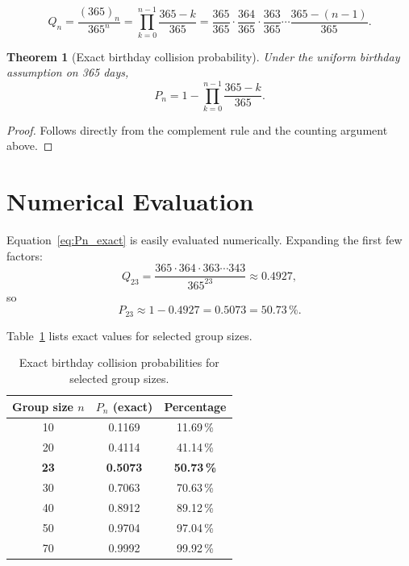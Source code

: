\documentclass[12pt]{report}
\newtheorem{theorem}{Theorem}[chapter]
\theoremstyle{definition}
\begin{document}
\begin{equation}\label{eq:Qn}
  Q_n
  = \frac{(365)_n}{365^n}
  = \prod_{k=0}^{n-1} \frac{365 - k}{365}
  = \frac{365}{365} \cdot \frac{364}{365} \cdot \frac{363}{365}
    \cdots \frac{365-(n-1)}{365}.
\end{equation}

\begin{theorem}[Exact birthday collision probability]
\label{thm:exact}
  Under the uniform birthday assumption on 365 days,
  \begin{equation}\label{eq:Pn_exact}
    \boxed{P_n = 1 - \prod_{k=0}^{n-1}\frac{365-k}{365}.}
  \end{equation}
\end{theorem}

\begin{proof}
  Follows directly from the complement rule and the counting argument above.
\end{proof}

\section{Numerical Evaluation}

Equation~\eqref{eq:Pn_exact} is easily evaluated numerically.  Expanding the first few
factors:
\[
  Q_{23}
  = \frac{365 \cdot 364 \cdot 363 \cdots 343}{365^{23}}
  \approx 0.4927,
\]
so
\[
  P_{23} \approx 1 - 0.4927 = \mathbf{0.5073} = 50.73\,\%.
\]

Table~\ref{tab:exact} lists exact values for selected group sizes.

\begin{table}[ht]
  \centering
  \caption{Exact birthday collision probabilities for selected group sizes.}
  \label{tab:exact}
  \begin{tabular}{@{}ccc@{}}
    \toprule
    Group size $n$ & $P_n$ (exact) & Percentage \\
    \midrule
     10 & 0.1169 & 11.69\,\% \\
     20 & 0.4114 & 41.14\,\% \\
     \textbf{23} & \textbf{0.5073} & \textbf{50.73\,\%} \\
     30 & 0.7063 & 70.63\,\% \\
     40 & 0.8912 & 89.12\,\% \\
     50 & 0.9704 & 97.04\,\% \\
     70 & 0.9992 & 99.92\,\% \\
    \bottomrule
  \end{tabular}
\end{table}
\end{document}
